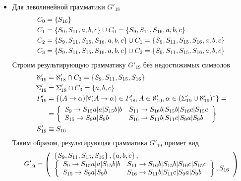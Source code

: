 \begin{itemize}
	\item Для леволинейной грамматики \(G'_{18}\)
	      \begin{align*}
		      C_{0} & = \left\{S_{16}\right\}                                                                                       \\
		      C_{1} & = \left\{S_9, S_{11}, a, b, c\right\} \cup C_{0} = \left\{S_9, S_{11}, S_{16}, a, b, c\right\}                         \\
		      C_{2} & = \left\{S_9, S_{11}, S_{15}, S_{16}, a, b, c\right\} \cup C_{1} = \left\{S_9, S_{11}, S_{15}, S_{16}, a, b, c\right\} \\
		      C_{3} & = \left\{S_9, S_{11}, S_{15}, S_{16}, a, b, c\right\} \cup C_{2} = \left\{S_9, S_{11}, S_{15}, S_{16}, a, b, c\right\}
	      \end{align*}
	      Строим результирующую грамматику \(G'_{19}\) без недостижимых символов
	      \begin{align*}
		      \aleph'_{19} & = \aleph'_{18} \cap C_{3} = \left\{S_9, S_{11}, S_{15}, S_{16}\right\}                                                                \\
		      \Sigma'_{19} & = \Sigma'_{18} \cap C_{3} = \left\{a, b, c\right\}                                                                                    \\
		      P'_{19}      & = \left\{(A \to \alpha) | \forall (A\to\alpha)\in P'_{18},A\in \aleph'_{19}, \alpha \in (\Sigma'_{19} \cup  \aleph'_{19})^*\right\} = \\
		                   & = \left\{\begin{array}{ll}
				                            S_9 \to S_{15}a|a|S_{15}b|b & S_{11} \to S_{16}b|S_{15}b|S_{16}c|S_{15}c \\
				                            S_{15} \to S_9a|S_9b        & S_{16} \to S_{11}b|S_{11}c|S_9a|S_9b
			                            \end{array}\right\}                                              \\
		      S'_{19}      & \equiv S_{16}
	      \end{align*}
	      Таким образом, результирующая грамматика \(G'_{19}\) примет вид
	      \begin{align*}
		      G'_{19} = \grammatics{S_9, S_{11}, S_{15}, S_{16}}{\cbr{a, b, c}}{%
		      S_9 \to S_{15}a|a|S_{15}b|b & S_{11} \to S_{16}b|S_{15}b|S_{16}c|S_{15}c \\
		      S_{15} \to S_9a|S_9b        & S_{16} \to S_{11}b|S_{11}c|S_9a|S_9b
		      }{S_{16}}

\end{align*}
\end{itemize}
